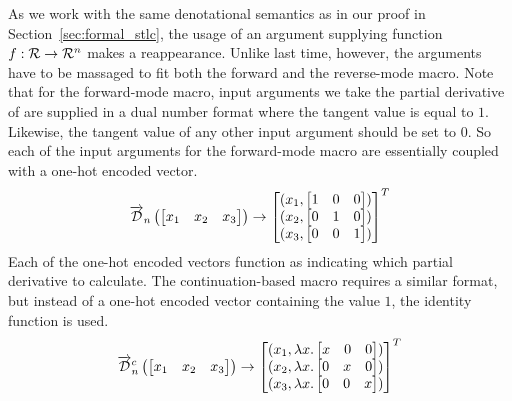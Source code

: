   As we work with the same denotational semantics as in our proof in Section~\ref{sec:formal_stlc}, the usage of an argument supplying function $f : \mathcal{R} \rightarrow \mathcal{R}^n$ makes a reappearance.
  Unlike last time, however, the arguments have to be massaged to fit both the forward and the reverse-mode macro.
  Note that for the forward-mode macro, input arguments we take the partial derivative of are supplied in a dual number format where the tangent value is equal to $1$.
  Likewise, the tangent value of any other input argument should be set to $0$.
  So each of the input arguments for the forward-mode macro are essentially coupled with a one-hot encoded vector.
  \begin{equation*}
    \overrightarrow{\mathcal{D}}_n\left(
    \begin{bmatrix}
      x_1 & x_2 & x_3 \\
    \end{bmatrix}\right)
    \to
    \begin{bmatrix}
      (x_1,
        \begin{bmatrix}
          1 & 0 & 0 \\
        \end{bmatrix}) \\
      (x_2,
        \begin{bmatrix}
          0 & 1 & 0 \\
        \end{bmatrix}) \\
      (x_3,
        \begin{bmatrix}
          0 & 0 & 1 \\
        \end{bmatrix}) \\
    \end{bmatrix}^T
  \end{equation*}
  Each of the one-hot encoded vectors function as indicating which partial derivative to calculate.
  The continuation-based macro requires a similar format, but instead of a one-hot encoded vector containing the value $1$, the identity function is used.
  \begin{equation*}
    \overrightarrow{\mathcal{D}}^c_n\left(
    \begin{bmatrix}
      x_1 & x_2 & x_3 \\
    \end{bmatrix}\right)
    \to
    \begin{bmatrix}
      (x_1,
        \lambda x.
        \begin{bmatrix}
          x & 0 & 0 \\
        \end{bmatrix}) \\
      (x_2,
        \lambda x.
        \begin{bmatrix}
          0 & x & 0 \\
        \end{bmatrix}) \\
      (x_3,
        \lambda x.
        \begin{bmatrix}
          0 & 0 & x \\
        \end{bmatrix}) \\
    \end{bmatrix}^T
  \end{equation*}

